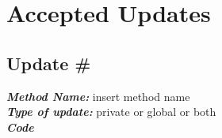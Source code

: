 \documentclass[a4paper,10pt]{article}
\begin{document}
\section*{Accepted Updates}
\subsection*{Update \#}
\textit{\textbf{Method Name:}} insert method name 
\medskip\\
\textit{\textbf{Type of update:}} private or global or both
\medskip\\
\textit{\textbf{Code}} 
\end{document}
